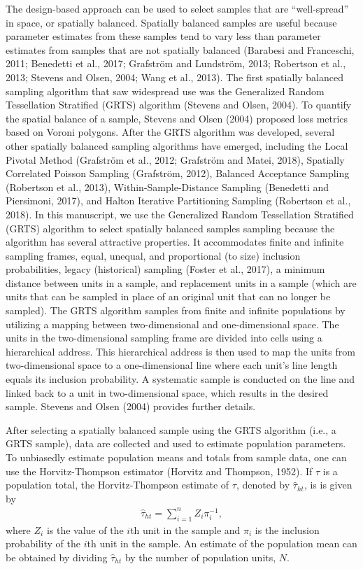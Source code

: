 \documentclass[]{elsarticle} %
\begin{document}
The design-based approach can be used to select samples that are
``well-spread'' in space, or spatially balanced. Spatially balanced
samples are useful because parameter estimates from these samples tend
to vary less than parameter estimates from samples that are not
spatially balanced (Barabesi and Franceschi, 2011; Benedetti et al.,
2017; Grafström and Lundström, 2013; Robertson et al., 2013; Stevens and
Olsen, 2004; Wang et al., 2013). The first spatially balanced sampling
algorithm that saw widespread use was the Generalized Random
Tessellation Stratified (GRTS) algorithm (Stevens and Olsen, 2004). To
quantify the spatial balance of a sample, Stevens and Olsen (2004)
proposed loss metrics based on Voroni polygons. After the GRTS algorithm
was developed, several other spatially balanced sampling algorithms have
emerged, including the Local Pivotal Method (Grafström et al., 2012;
Grafström and Matei, 2018), Spatially Correlated Poisson Sampling
(Grafström, 2012), Balanced Acceptance Sampling (Robertson et al.,
2013), Within-Sample-Distance Sampling (Benedetti and Piersimoni, 2017),
and Halton Iterative Partitioning Sampling (Robertson et al., 2018). In
this manuscript, we use the Generalized Random Tessellation Stratified
(GRTS) algorithm to select spatially balanced samples sampling because
the algorithm has several attractive properties. It accommodates finite
and infinite sampling frames, equal, unequal, and proportional (to size)
inclusion probabilities, legacy (historical) sampling (Foster et al.,
2017), a minimum distance between units in a sample, and replacement
units in a sample (which are units that can be sampled in place of an
original unit that can no longer be sampled). The GRTS algorithm samples
from finite and infinite populations by utilizing a mapping between
two-dimensional and one-dimensional space. The units in the
two-dimensional sampling frame are divided into cells using a
hierarchical address. This hierarchical address is then used to map the
units from two-dimensional space to a one-dimensional line where each
unit's line length equals its inclusion probability. A systematic sample
is conducted on the line and linked back to a unit in two-dimensional
space, which results in the desired sample. Stevens and Olsen (2004)
provides further details.

After selecting a spatially balanced sample using the GRTS algorithm
(i.e., a GRTS sample), data are collected and used to estimate
population parameters. To unbiasedly estimate population means and
totals from sample data, one can use the Horvitz-Thompson estimator
(Horvitz and Thompson, 1952). If \(\tau\) is a population total, the
Horvitz-Thompson estimate of \(\tau\), denoted by \(\hat{\tau}_{ht}\),
is is given by \begin{align}\label{eq:ht}
  \hat{\tau}_{ht} = \sum_{i = 1}^n Z_i \pi_i^{-1},
\end{align} where \(Z_i\) is the value of the \(i\)th unit in the sample
and \(\pi_i\) is the inclusion probability of the \(i\)th unit in the
sample. An estimate of the population mean can be obtained by dividing
\(\hat{\tau}_{ht}\) by the number of population units, \(N\).
\end{document}
